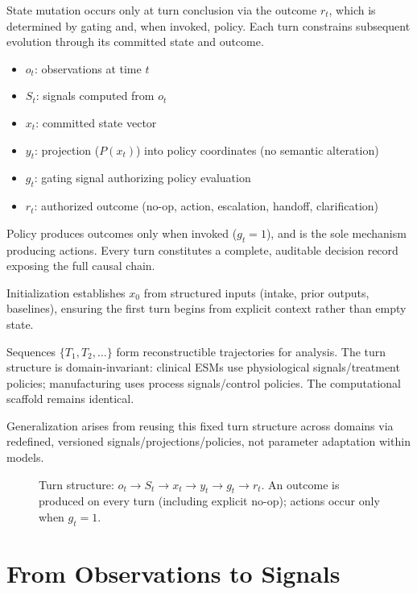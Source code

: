 \documentclass[11pt]{article}
\begin{document}
State mutation occurs only at turn conclusion via the outcome $r_t$, which is determined by gating and, when invoked, policy. Each turn constrains subsequent evolution through its committed state and outcome.

\begin{itemize}
\item $o_t$: observations at time $t$
\item $S_t$: signals computed from $o_t$
\item $x_t$: committed state vector
\item $y_t$: projection ($P(x_t)$) into policy coordinates (no semantic alteration)
\item $g_t$: gating signal authorizing policy evaluation
\item $r_t$: authorized outcome (no-op, action, escalation, handoff, clarification)
\end{itemize}

Policy produces outcomes only when invoked ($g_t = 1$), and is the sole mechanism producing actions. Every turn constitutes a complete, auditable decision record exposing the full causal chain.

Initialization establishes $x_0$ from structured inputs (intake, prior outputs, baselines), ensuring the first turn begins from explicit context rather than empty state.

Sequences $\{T_1, T_2, \dots\}$ form reconstructible trajectories for analysis. The turn structure is domain-invariant: clinical ESMs use physiological signals/treatment policies; manufacturing uses process signals/control policies. The computational scaffold remains identical.

Generalization arises from reusing this fixed turn structure across domains via redefined, versioned signals/projections/policies, not parameter adaptation within models.

\vspace{0.5em}
\begin{figure}[H]
\centering

\caption{Turn structure: $o_t \to S_t \to x_t \to y_t \to g_t \to r_t$. An outcome is produced on every turn (including explicit no-op); actions occur only when $g_t = 1$.}
\label{fig:esm-core-loop}
\end{figure}

\section{From Observations to Signals}
\end{document}
